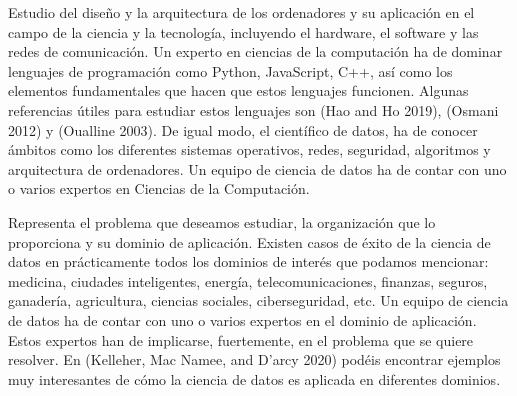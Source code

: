 \documentclass[
  letterpaper,
  DIV=11,
  numbers=noendperiod]{scrreprt}
\begin{document}
\begin{tcolorbox}[enhanced jigsaw, arc=.35mm, breakable, coltitle=black, left=2mm, opacityback=0, bottomtitle=1mm, colbacktitle=quarto-callout-note-color!10!white, title=\textcolor{quarto-callout-note-color}{\faInfo}\hspace{0.5em}{Ciencias de la Computación}, titlerule=0mm, colback=white, colframe=quarto-callout-note-color-frame, bottomrule=.15mm, rightrule=.15mm, opacitybacktitle=0.6, toptitle=1mm, toprule=.15mm, leftrule=.75mm]

Estudio del diseño y la arquitectura de los ordenadores y su aplicación
en el campo de la ciencia y la tecnología, incluyendo el hardware, el
software y las redes de comunicación. Un experto en ciencias de la
computación ha de dominar lenguajes de programación como Python,
JavaScript, C++, así como los elementos fundamentales que hacen que
estos lenguajes funcionen. Algunas referencias útiles para estudiar
estos lenguajes son (Hao and Ho 2019), (Osmani 2012) y (Oualline 2003).
De igual modo, el científico de datos, ha de conocer ámbitos como los
diferentes sistemas operativos, redes, seguridad, algoritmos y
arquitectura de ordenadores. Un equipo de ciencia de datos ha de contar
con uno o varios expertos en Ciencias de la Computación.

\end{tcolorbox}

\begin{tcolorbox}[enhanced jigsaw, arc=.35mm, breakable, coltitle=black, left=2mm, opacityback=0, bottomtitle=1mm, colbacktitle=quarto-callout-note-color!10!white, title=\textcolor{quarto-callout-note-color}{\faInfo}\hspace{0.5em}{Conocimiento del Dominio}, titlerule=0mm, colback=white, colframe=quarto-callout-note-color-frame, bottomrule=.15mm, rightrule=.15mm, opacitybacktitle=0.6, toptitle=1mm, toprule=.15mm, leftrule=.75mm]

Representa el problema que deseamos estudiar, la organización que lo
proporciona y su dominio de aplicación. Existen casos de éxito de la
ciencia de datos en prácticamente todos los dominios de interés que
podamos mencionar: medicina, ciudades inteligentes, energía,
telecomunicaciones, finanzas, seguros, ganadería, agricultura, ciencias
sociales, ciberseguridad, etc. Un equipo de ciencia de datos ha de
contar con uno o varios expertos en el dominio de aplicación. Estos
expertos han de implicarse, fuertemente, en el problema que se quiere
resolver. En (Kelleher, Mac Namee, and D'arcy 2020) podéis encontrar
ejemplos muy interesantes de cómo la ciencia de datos es aplicada en
diferentes dominios.

\end{tcolorbox}
\end{document}
